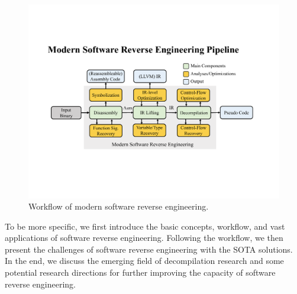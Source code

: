 \begin{figure}[tb]
  \centering
  \includegraphics[width=1.0\textwidth]{fig/workflow.pdf}
  \caption{Workflow of modern software reverse engineering.}
  \label{fig:workflow}
\end{figure}


To be more specific, we first introduce the basic concepts, workflow, and vast
applications of software reverse engineering. Following the workflow, we then
present the challenges of software reverse engineering with the SOTA solutions.
In the end, we discuss the emerging field of decompilation research and some
potential research directions for further improving the capacity of software
reverse engineering.


\newpage
